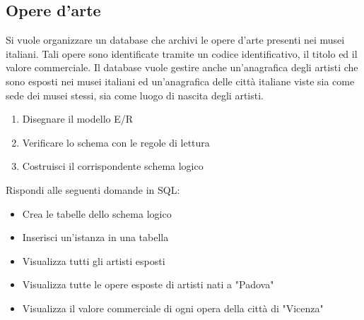 \documentclass{article}
\begin{document}
	\subsection{Opere d'arte}
	Si vuole organizzare un database che archivi le opere d’arte presenti nei musei italiani. Tali opere sono identificate tramite un codice identificativo, il titolo ed il valore commerciale. Il database vuole gestire anche un’anagrafica degli artisti che sono esposti nei musei italiani ed un’anagrafica delle città italiane viste sia come sede dei musei stessi, sia come luogo di nascita degli artisti.
	\begin{enumerate}
		\item Disegnare il modello E/R
		\item Verificare lo schema con le regole di lettura
		\item Costruisci il corrispondente schema logico
	\end{enumerate}
	Rispondi alle seguenti domande in SQL:
	\begin{itemize}
		\item Crea le tabelle dello schema logico
		\item Inserisci un'istanza in una tabella
		\item Visualizza tutti gli artisti esposti
		\item Visualizza tutte le opere esposte di artisti nati a "Padova"
		\item Visualizza il valore commerciale di ogni opera della città di "Vicenza"
	\end{itemize}
\end{document}
